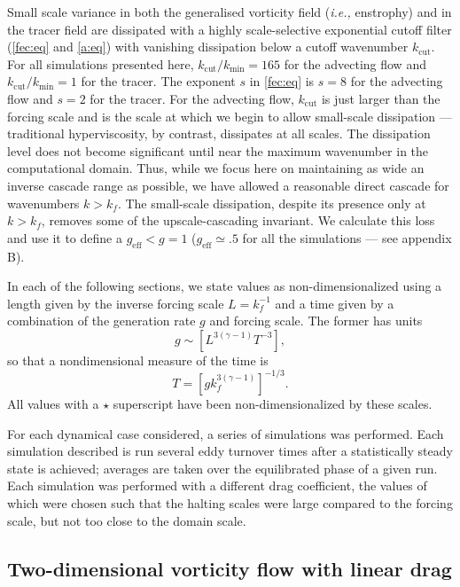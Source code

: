 \documentclass{jfm}
\newcommand{\ie}  {\textit{i.e., }}
\begin{document}
Small scale variance in both the generalised vorticity field (\ie
enstrophy) and in the tracer field are dissipated with a highly
scale-selective exponential cutoff filter (\ref{fec:eq} and
\ref{a:eq}) with vanishing dissipation below a cutoff wavenumber
$k_{\mathrm{cut}}$.  For all simulations presented here,
$k_{\mathrm{cut}}/k_{\mathrm{min}}=165$ for the advecting flow and
$k_{\mathrm{cut}}/k_{\mathrm{min}}=1$ for the tracer.  The exponent
$s$ in \eqref{fec:eq} is $s=8$ for the advecting flow and $s=2$ for
the tracer.  For the advecting flow, $k_{\mathrm{cut}}$ is just larger
than the forcing scale and is the scale at which we begin to allow
small-scale dissipation --- traditional hyperviscosity, by contrast,
dissipates at all scales. The dissipation level does not become
significant until near the maximum wavenumber in the computational
domain.  Thus, while we focus here on maintaining as wide an inverse
cascade range as possible, we have allowed a reasonable direct cascade
for wavenumbers $k>k_f$.  The small-scale dissipation, despite its
presence only at $k>k_f$, removes some of the upscale-cascading
invariant.  We calculate this loss and use it to define a
$g_{\mathrm{eff}} < g = 1$ ($g_{\mathrm{eff}} \simeq .5$ for all the
simulations --- see appendix B).

In each of the following sections, we state values as
non-dimensionalized using a length given by the inverse forcing
scale $L = k_f^{-1}$ and a time given by a combination of the
generation rate $g$ and forcing scale.  The former has units
\[
g \sim \left[L^{3(\gamma-1)}T^{-3}\right],
\]
so that a nondimensional measure of the time is
\begin{equation}
T = \left[g k_f^{3(\gamma-1)}\right]^{-1/3}.
\label{Tdim:eq}
\end{equation}
All values with a $\star$ superscript have been
non-dimensionalized by these scales.

For each dynamical case considered, a series of simulations was
performed.   Each simulation described is run several eddy
turnover times after a statistically steady state is achieved;
averages are taken over the equilibrated phase of a given run.
Each simulation was performed with a different drag coefficient,
the values of which were chosen such that the halting scales were
large compared to the forcing scale, but not too close to the
domain scale.

\subsection{Two-dimensional vorticity flow with linear drag}
\label{tdv_exp:ssc}
\end{document}
